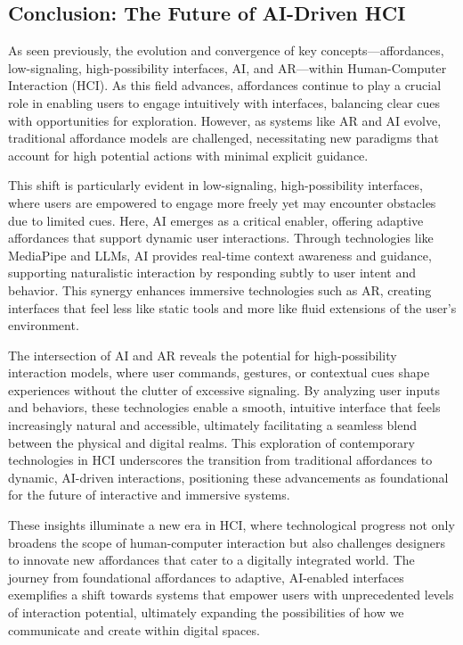 \subsection{Conclusion:  The Future of AI-Driven HCI}

As seen previously, the evolution and convergence of key concepts—affordances, low-signaling, high-possibility interfaces, AI, and AR—within Human-Computer Interaction (HCI).
As this field advances, affordances continue to play a crucial role in enabling users to engage intuitively with interfaces, balancing clear cues with opportunities for exploration.
However, as systems like AR and AI evolve, traditional affordance models are challenged, necessitating new paradigms that account for high potential actions with minimal explicit guidance.

This shift is particularly evident in low-signaling, high-possibility interfaces, where users are empowered to engage more freely yet may encounter obstacles due to limited cues.
Here, AI emerges as a critical enabler, offering adaptive affordances that support dynamic user interactions.
Through technologies like MediaPipe and LLMs, AI provides real-time context awareness and guidance, supporting naturalistic interaction by responding subtly to user intent and behavior.
This synergy enhances immersive technologies such as AR, creating interfaces that feel less like static tools and more like fluid extensions of the user’s environment.

The intersection of AI and AR reveals the potential for high-possibility interaction models, where user commands, gestures, or contextual cues shape experiences without the clutter of excessive signaling.
By analyzing user inputs and behaviors, these technologies enable a smooth, intuitive interface that feels increasingly natural and accessible, ultimately facilitating a seamless blend between the physical and digital realms.
This exploration of contemporary technologies in HCI underscores the transition from traditional affordances to dynamic, AI-driven interactions, positioning these advancements as foundational for the future of interactive and immersive systems.

These insights illuminate a new era in HCI, where technological progress not only broadens the scope of human-computer interaction but also challenges designers to innovate new affordances that cater to a digitally integrated world.
The journey from foundational affordances to adaptive, AI-enabled interfaces exemplifies a shift towards systems that empower users with unprecedented levels of interaction potential, ultimately expanding the possibilities of how we communicate and create within digital spaces.